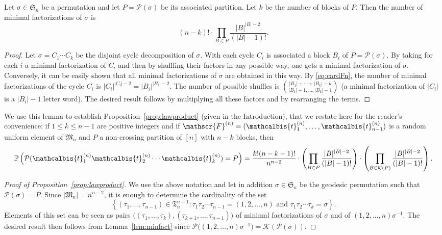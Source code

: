 \documentclass[10pt]{amsart}
\theoremstyle{definition}\newtheorem{defi}[theo]{Definition}\newtheorem{rema}[theo]{Remark}\newtheorem{exam}[theo]{Example}\newtheorem{exem}[theo]{Example}\newtheorem{nota}[theo]{Notation}
\def\PPP{\mathcal P}
\def\tb{\mathcalbis{t}}
\renewcommand\Pr[1]{\mathbb{P}\left(#1\right)}
\begin{document}
\begin{lemma}\label{lem:minfact}
Let $\sigma \in \mathfrak{S}_{n}$ be a permutation and let $P=\PPP(\sigma)$ be its associated partition. Let $k$ be the number of blocks of $P$. Then the number of minimal factorizations of $\sigma$ is
\[ \left( n- k \right) !  \cdot\prod_{B \in P}    \frac{|B|^{|B|-2}}{(|B|-1)!}.\]
\end{lemma}

\begin{proof}
Let $\sigma=C_1  \cdots C_k$ be the disjoint cycle decomposition of $\sigma$.
With each cycle $C_i$ is associated a block $B_i$ of $P=\PPP(\sigma)$.
By taking for each $i$ a minimal factorization of $C_i$ and then by shuffling their factors in any possible way, one gets a minimal factorization of $\sigma$. Conversely, it can be easily shown
that all minimal factorizations of $\sigma$ are obtained in this way.
 By \eqref{eq:cardFn}, the number of minimal factorizations of the cycle $C_i$
 is $|C_i|^{|C_i|-2}=|B_i|^{|B_i|-2} $.
 The number of possible shuffles is
$ \binom{|B_{1}|+\cdots+|B_{k}|-k}{|B_{1}|-1, \ldots,|B_{k}|-1 }$
(a minimal factorization of $|C_{i}|$ is a $|B_i|-1$ letter word).
The desired result follows by multiplying all these factors and by rearranging the terms.
\end{proof}

We use this lemma to establish Proposition~\ref{prop:lawproduct} (given in the Introduction),
that we restate here for the reader's convenience:
if $1 \leq k \leq n -1$ are positive integers and if
$\mathscr{F}^{(n)}= (\tb_{1}^{(n)}, \ldots, \tb_{n-1}^{(n)})$ is a random uniform element of $ \mathfrak{M}_{n}$
and $P$ a non-crossing partition of $[n]$ with $n-k$ blocks,
then
\[\Pr{\PPP(\tb_{1}^{(n)} \tb_{2}^{(n)} \cdots \tb_{k}^{(n)})=P}= \frac{k! (n-k-1)!}{n^{n-2}}  \cdot  \left( \prod_{B \in P} \frac{|B|^{|B|-2}}{(|B|-1)!} \right) \cdot \left(  \prod_{B \in  \mathcal{K}(P)} \frac{|B|^{|B|-2}}{(|B|-1)!} \right).\]

\begin{proof}[Proof of Proposition~\ref{prop:lawproduct}]
  We use the above notation and
let in addition $\sigma \in \mathfrak{S}_{n}$ be the geodesic permutation such that $\PPP(\sigma)=P$.  Since $ | \mathfrak{M}_{n}|  =n^{n-2}$, it is enough to determine the cardinality of the set
\[\left\{ (\tau_{1}, \ldots, \tau_{n-1}) \in \mathfrak{T}_{n}^{n-1} : \tau_{1} \tau_{2} \cdots \tau_{n-1}= (1,2, \ldots,n) \textrm{ and } \tau_{1} \tau_{2} \cdots \tau_{k}= \sigma \right\}.\]
Elements of this set can be seen as pairs $\big( (\tau_1,\dots,\tau_k),(\tau_{k+1},\dots,\tau_{n-1}) \big)$
of minimal factorizations of $\sigma$
and of $(1,2, \ldots,n) \sigma^{-1}$.
The desired result then follows from Lemma~\ref{lem:minfact}
since $ \PPP \big(  (1,2, \ldots,n) \sigma^{-1} \big) =\mathcal{K}(\PPP(\sigma))$.
\end{proof}
\end{document}
